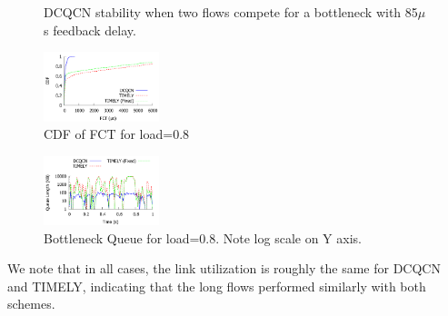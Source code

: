 \begin{figure}[t]
{\begin{minipage}{0.29\textwidth}
\vspace{-2em}
\caption{DCQCN stability when two flows compete for a 
bottleneck with 85$\mu$s feedback delay.}
\vspace{-2em}
\label{fig:dcqcn_bufferbloat}
\end{minipage}
}
\end{figure}

\begin{figure}[t]
\center
\includegraphics[width=0.3\textwidth]{figures/fct_cdf.pdf}
\caption{CDF of FCT for load=0.8}
\label{fig:fct_cdf}
\end{figure}

\begin{figure}[t]
\center
\includegraphics[width=0.3\textwidth]{figures/fct_queue.pdf}
\caption{Bottleneck Queue for load=0.8. Note log scale on Y axis.}
\label{fig:fct_queue}
\end{figure}
\fi

We note that in all cases, the link utilization is roughly the same for DCQCN
and TIMELY, indicating that the long flows performed similarly with both
schemes.

